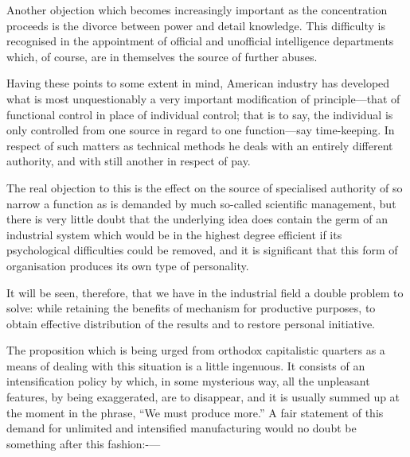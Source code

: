 \documentclass{book}
\begin{document}
Another objection which becomes increasingly important as the concentration proceeds is the divorce between power and detail knowledge. This difficulty is recognised in the appointment of official and unofficial intelligence departments which, of course, are in themselves the source of further abuses.

Having these points to some extent in mind, American industry has developed what is most unquestionably a very important modification of principle—that of functional control in place of individual control; that is to say, the individual is only controlled from one source in regard to one function—say time-keeping. In respect of such matters as technical methods he deals with an entirely different authority, and with still another in respect of pay.

The real objection to this is the effect on the source of specialised authority of so narrow a function as is demanded by much so-called scientific management, but there is very little doubt that the underlying idea does contain the germ of an industrial system which would be in the highest degree efficient if its psychological difficulties could be removed, and it is significant that this form of organisation produces its own type of personality.

It will be seen, therefore, that we have in the industrial field a double problem to solve: while retaining the benefits of mechanism for productive purposes, to obtain effective distribution of the results and to restore personal initiative.

The proposition which is being urged from orthodox capitalistic quarters as a means of dealing with this situation is a little ingenuous. It consists of an intensification policy by which, in some mysterious way, all the unpleasant features, by being exaggerated, are to disappear, and it is usually summed up at the moment in the phrase, “We must produce more.” A fair statement of this demand for unlimited and intensified manufacturing would no doubt be something after this fashion:-—
\end{document}
